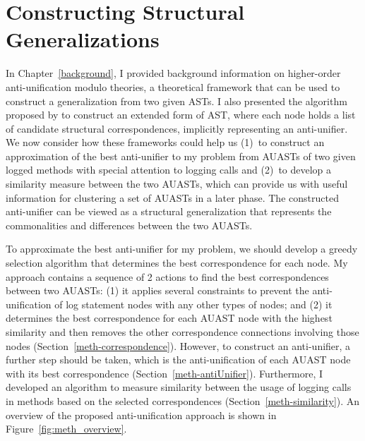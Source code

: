 \chapter{Constructing Structural Generalizations} \label{ch4} \label{methodology}

In Chapter~\ref{background}, I provided background information on higher-order anti-unification modulo theories, a theoretical framework that can be used to construct a generalization from two given ASTs. I also presented the algorithm proposed by \citet{2008:fse:cottrell} to construct an extended form of AST, where each node holds a list of candidate structural correspondences, implicitly representing an anti-unifier. We now consider how these frameworks could help us (1)~to construct an approximation of the best anti-unifier to my problem from AUASTs of two given logged methods with special attention to logging calls and (2)~to develop a similarity measure between the two AUASTs, which can provide us with useful information for clustering a set of AUASTs in a later phase. The constructed anti-unifier can be viewed as a structural generalization that represents the commonalities and differences between the two AUASTs.




To approximate the best anti-unifier for my problem, we should develop a greedy selection algorithm that determines the best correspondence for each node. My approach contains a sequence of 2 actions to find the best correspondences between two AUASTs: (1) it applies several constraints to prevent the anti-unification of log statement nodes with any other types of nodes; and (2) it determines the best correspondence for each AUAST node with the highest similarity and then removes the other correspondence connections involving those nodes (Section~\ref{meth-correspondence}). However, to construct an anti-unifier, a further step should be taken, which is the anti-unification of each AUAST node with its best correspondence (Section~\ref{meth-antiUnifier}). Furthermore, I developed an algorithm to measure similarity between the usage of logging calls in methods based on the selected correspondences (Section~\ref{meth-similarity}). An overview of the proposed anti-unification approach is shown in Figure~\ref{fig:meth_overview}.


